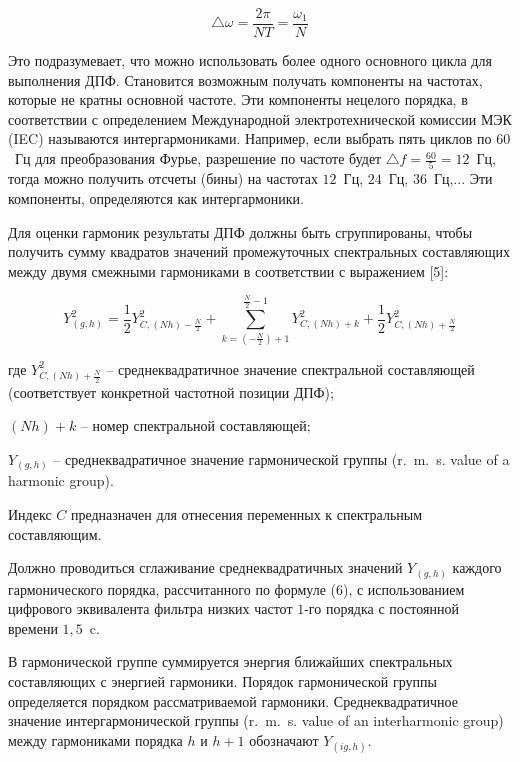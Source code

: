 \begin{equation}
	\label{eq:equation1}
\bigtriangleup \omega = \frac{2 \pi}{NT} = \frac{\omega_1}{N}
\end{equation}

Это подразумевает, что можно использовать более одного основного цикла для выполнения ДПФ. Становится возможным получать компоненты на частотах, которые не кратны основной частоте. Эти компоненты нецелого порядка, в соответствии с определением  Международной электротехнической комиссии МЭК (IEC) называются интергармониками. Например, если выбрать пять циклов по $60$~Гц для преобразования Фурье, разрешение по частоте будет $\bigtriangleup f = \frac{60}{5} = 12$~Гц, тогда можно получить отсчеты (бины) на частотах $12$~Гц, $24$~Гц, $36$~Гц,... Эти компоненты, определяются как интергармоники.

Для оценки гармоник результаты ДПФ должны быть сгруппированы, чтобы получить сумму квадратов значений промежуточных спектральных составляющих между двумя смежными гармониками в соответствии с выражением [5]: 
 
\begin{equation}
	\label{eq:equation1}
Y_{(g,h)}^2 = \frac{1}{2} Y_{C,(Nh)-\frac{N}{2}}^2 +  \displaystyle\sum_{k=(-\frac{N}{2})+1}^{\frac{N}{2}-1} Y_{C,(Nh)+k}^2 + \frac{1}{2} Y_{C,(Nh)+\frac{N}{2}}^2
\end{equation} 
 
где $Y_{C,(Nh)+\frac{N}{2}}^2$  – среднеквадратичное значение спектральной составляющей (соответствует конкретной частотной позиции ДПФ);

$(Nh) + k$ – номер спектральной составляющей;

$Y_{(g,h)}$ –   среднеквадратичное значение гармонической группы (r.~m.~s. value of a harmonic group).

Индекс $C$ предназначен для отнесения переменных к спектральным составляющим.

Должно проводиться сглаживание среднеквадратичных значений $Y_{(g,h)}$ каждого гармонического порядка, рассчитанного по формуле (6), с использованием цифрового эквивалента фильтра низких частот $1$-го порядка с постоянной времени  $1,5$~c.

В гармонической группе суммируется энергия ближайших спектральных составляющих с энергией гармоники. Порядок гармонической группы определяется порядком рассматриваемой гармоники. Среднеквадратичное значение интергармонической группы (r.~m.~s. value of an interharmonic group) между гармониками порядка $h$ и $h+1$ обозначают $Y_{(ig,h)}$.

